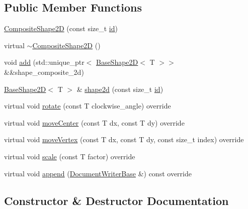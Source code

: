 \subsection*{Public Member Functions}
\begin{DoxyCompactItemize}
\item 
\hyperlink{classGraphicalEditorCore_1_1CompositeShape2D_af8dcc9f1047e1594cfbe61b62dd6a0ce}{Composite\+Shape2D} (const size\+\_\+t \hyperlink{classGraphicalEditorCore_1_1BaseShape2D_ac66cfa23289ae36d70ff6b7c41dd791f}{id})
\item 
virtual \hyperlink{classGraphicalEditorCore_1_1CompositeShape2D_a0a5658b8caf83f1578ed32b762e5db2c}{$\sim$\+Composite\+Shape2D} ()
\item 
void \hyperlink{classGraphicalEditorCore_1_1CompositeShape2D_afa65e170aed5aa31d67b1f541c24f656}{add} (std\+::unique\+\_\+ptr$<$ \hyperlink{classGraphicalEditorCore_1_1BaseShape2D}{Base\+Shape2D}$<$ T $>$$>$ \&\&shape\+\_\+composite\+\_\+2d)
\item 
\hyperlink{classGraphicalEditorCore_1_1BaseShape2D}{Base\+Shape2D}$<$ T $>$ \& \hyperlink{classGraphicalEditorCore_1_1CompositeShape2D_a4cfefba661a2a6652ec2554e77ecba71}{shape2d} (const size\+\_\+t \hyperlink{classGraphicalEditorCore_1_1BaseShape2D_ac66cfa23289ae36d70ff6b7c41dd791f}{id})
\item 
virtual void \hyperlink{classGraphicalEditorCore_1_1CompositeShape2D_a1ad124ab5448a4276d06742318744473}{rotate} (const T clockwise\+\_\+angle) override
\item 
virtual void \hyperlink{classGraphicalEditorCore_1_1CompositeShape2D_a16cb9751cbd8f587f7f68ce831314e14}{move\+Center} (const T dx, const T dy) override
\item 
virtual void \hyperlink{classGraphicalEditorCore_1_1CompositeShape2D_a2754d592f39a2c442681fad8039e682f}{move\+Vertex} (const T dx, const T dy, const size\+\_\+t index) override
\item 
virtual void \hyperlink{classGraphicalEditorCore_1_1CompositeShape2D_ae1d0a3270ae8eeec8a87c5a37d657336}{scale} (const T factor) override
\item 
virtual void \hyperlink{classGraphicalEditorCore_1_1CompositeShape2D_af0ed12595f25239559d340c81d0fcb0d}{append} (\hyperlink{classGraphicalEditorCore_1_1DocumentWriterBase}{Document\+Writer\+Base} \&) const override
\end{DoxyCompactItemize}


\subsection{Constructor \& Destructor Documentation}
